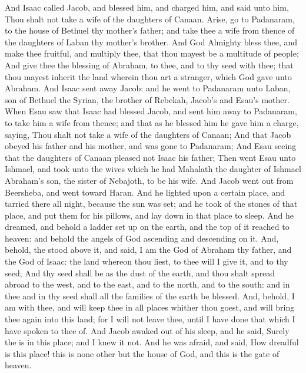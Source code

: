 \begin{biblechapter} %
\verse And Isaac called Jacob, and blessed him, and charged him, and said unto him, Thou shalt not take a wife of the daughters of Canaan.
\verse Arise, go to Padanaram, to the house of Bethuel thy mother's father; and take thee a wife from thence of the daughters of Laban thy mother's brother.
\verse And God Almighty bless thee, and make thee fruitful, and multiply thee, that thou mayest be a multitude of people;
\verse And give thee the blessing of Abraham, to thee, and to thy seed with thee; that thou mayest inherit the land wherein thou art a stranger, which God gave unto Abraham.
\verse And Isaac sent away Jacob: and he went to Padanaram unto Laban, son of Bethuel the Syrian, the brother of Rebekah, Jacob's and Esau's mother.
\verse When Esau saw that Isaac had blessed Jacob, and sent him away to Padanaram, to take him a wife from thence; and that as he blessed him he gave him a charge, saying, Thou shalt not take a wife of the daughters of Canaan;
\verse And that Jacob obeyed his father and his mother, and was gone to Padanaram;
\verse And Esau seeing that the daughters of Canaan pleased not Isaac his father;
\verse Then went Esau unto Ishmael, and took unto the wives which he had Mahalath the daughter of Ishmael Abraham's son, the sister of Nebajoth, to be his wife.
 And Jacob went out from Beersheba, and went toward Haran.
\verse And he lighted upon a certain place, and tarried there all night, because the sun was set; and he took of the stones of that place, and put them for his pillows, and lay down in that place to sleep.
\verse And he dreamed, and behold a ladder set up on the earth, and the top of it reached to heaven: and behold the angels of God ascending and descending on it.
\verse And, behold, the \LORD stood above it, and said, I am the \LORD God of Abraham thy father, and the God of Isaac: the land whereon thou liest, to thee will I give it, and to thy seed;
\verse And thy seed shall be as the dust of the earth, and thou shalt spread abroad to the west, and to the east, and to the north, and to the south: and in thee and in thy seed shall all the families of the earth be blessed.
\verse And, behold, I am with thee, and will keep thee in all places whither thou goest, and will bring thee again into this land; for I will not leave thee, until I have done that which I have spoken to thee of.
\verse And Jacob awaked out of his sleep, and he said, Surely the \LORD is in this place; and I knew it not.
\verse And he was afraid, and said, How dreadful is this place! this is none other but the house of God, and this is the gate of heaven.

\end{biblechapter}
